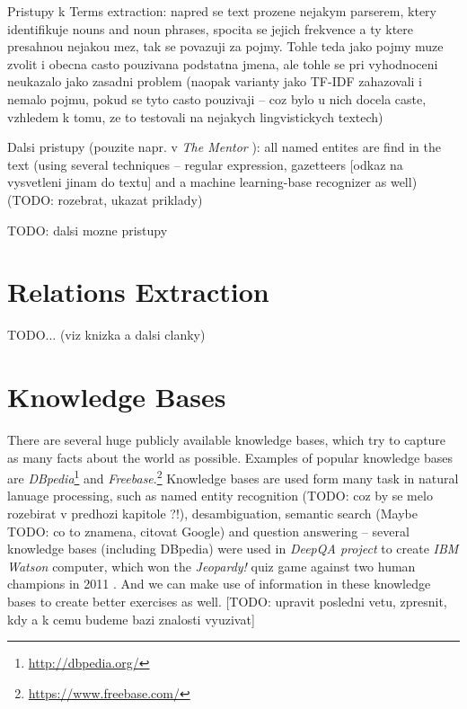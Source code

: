 \documentclass[a4paper, 12pt, twoside]{fithesis2}		%
\renewcommand{\_}{\leavevmode \kern0.0em\vbox{\hrule width0.4em}}
\begin{document}
Pristupy k Terms extraction: napred se text prozene nejakym parserem, ktery identifikuje nouns and noun phrases, spocita se jejich frekvence a ty ktere presahnou nejakou mez, tak se povazuji za pojmy. Tohle teda jako pojmy muze zvolit i obecna casto pouzivana podstatna jmena, ale tohle se pri vyhodnoceni neukazalo jako zasadni problem (naopak varianty jako TF-IDF zahazovali i nemalo pojmu, pokud se tyto casto pouzivaji -- coz bylo u nich docela caste, vzhledem k tomu, ze to testovali na nejakych lingvistickych textech)
\cite{question-gen-mitkov}

Dalsi pristupy (pouzite napr. v \textit{The Mentor} \cite{mentor}): all named entites are find in the text
(using several techniques -- regular expression, gazetteers [odkaz na vysvetleni jinam do textu] and a machine learning-base recognizer as well) (TODO: rozebrat, ukazat priklady)

TODO: dalsi mozne pristupy

\section{Relations Extraction}
\label{sec:relations-extraction}

TODO... (viz knizka a dalsi clanky)

\section{Knowledge Bases}
\label{sec:knowledge-bases}

There are several huge publicly available knowledge bases,
which try to capture as many facts about the world as possible.
Examples of popular knowledge bases are
\textit{DBpedia}\footnote{\url{http://dbpedia.org/}}
and \textit{Freebase}.\footnote{\url{https://www.freebase.com/}}
Knowledge bases are used form many task in natural lanuage processing,
such as named entity recognition (TODO: coz by se melo rozebirat v predhozi kapitole ?!),
desambiguation,
semantic search (Maybe TODO: co to znamena, citovat Google)
and question answering -- several knowledge bases (including DBpedia) were used in \emph{DeepQA project} to create \emph{IBM Watson} computer, which won the \emph{Jeopardy!} quiz game against two human champions in 2011 \cite{watson}. And we can make use of information in these knowledge bases to create better exercises as well. [TODO: upravit posledni vetu, zpresnit, kdy a k cemu budeme bazi znalosti vyuzivat]
\end{document}
